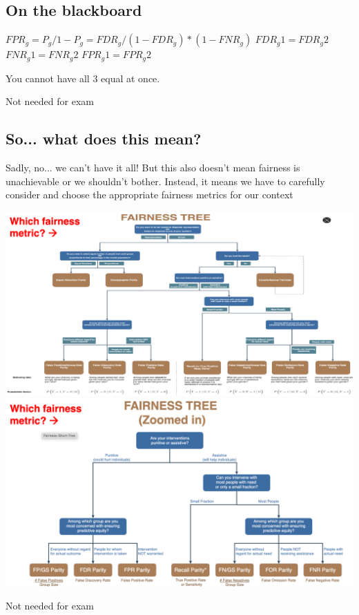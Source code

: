 \documentclass[11pt]{article}
\theoremstyle{definition}
\begin{document}
\subsection{On the blackboard}
$FPR_g = P_g/1-P_g = FDR_g/(1-FDR_g) * (1-FNR_g)$
\newline
$FDR_g1 = FDR_g2$
\newline
$FNR_g1 = FNR_g2$
\newline
$FPR_g1 = FPR_g2$

You cannot have all 3 equal at once.

Not needed for exam

\subsection{So... what does this mean?}
Sadly, no... we can’t have it all!
But this also doesn’t mean fairness is unachievable or
we shouldn’t bother.
Instead, it means we have to carefully consider and
choose the appropriate fairness metrics for our
context

\includegraphics[width=\textwidth]{11.png}
\includegraphics[width=\textwidth]{12.png}

Not needed for exam
\end{document}
